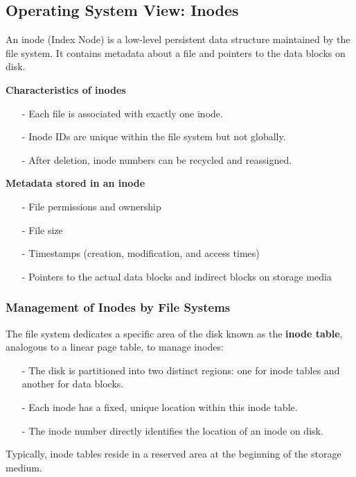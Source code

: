 \subsection{Operating System View: Inodes}
\begin{definition}[Inode]
  An inode (Index Node) is a low-level persistent data structure maintained by the file system. It contains metadata about a file and pointers to the data blocks on disk. \\[5px]
\end{definition}
\noindent
\begin{minipage}[htp]{0.45\textwidth}
\textbf{Characteristics of inodes}
\begin{itemize}
    \item[-] Each file is associated with exactly one inode.
    \item[-] Inode IDs are unique within the file system but not globally.
    \item[-] After deletion, inode numbers can be recycled and reassigned.
\end{itemize}
\end{minipage}%
\hfill
\vline
\hfill
\begin{minipage}[htp]{0.45\textwidth}
\textbf{Metadata stored in an inode}
\begin{itemize}[itemsep=3pt, topsep=1pt]
  \item[-] File permissions and ownership
  \item[-] File size
  \item[-] Timestamps (creation, modification, and access times)
  \item[-] Pointers to the actual data blocks and indirect blocks on storage media
\end{itemize}
\end{minipage}

\subsubsection{Management of Inodes by File Systems}
The file system dedicates a specific area of the disk known as the \textbf{inode table}, analogous to a linear page table, to manage inodes:
\begin{itemize}[itemsep=3pt, topsep=1pt]
  \item[-] The disk is partitioned into two distinct regions: one for inode tables and another for data blocks.
  \item[-] Each inode has a fixed, unique location within this inode table.
  \item[-] The inode number directly identifies the location of an inode on disk.
\end{itemize}
Typically, inode tables reside in a reserved area at the beginning of the storage medium.
\newpage
